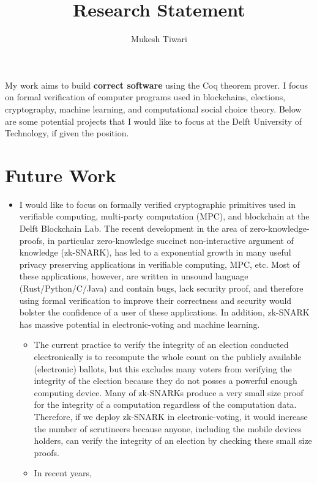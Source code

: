 \documentclass[a4paper]{article}
\title{Research Statement}
\author{Mukesh Tiwari}
\date{}
\begin{document}
\fontsize{11}{15}
\selectfont
\maketitle

My work aims to build \textbf{correct software} 
using the Coq theorem prover. 
I focus on formal verification of computer programs used in blockchains, elections, cryptography, 
machine learning, and computational social choice theory. Below are some potential projects 
that I would like to focus at the Delft University of Technology, if given the position.


\section{Future Work}
\begin{itemize}
\item I would like to focus 
	on formally verified cryptographic primitives used in
	verifiable computing, multi-party computation (MPC), and blockchain at the 
	Delft Blockchain Lab. The recent development in the 
	area of zero-knowledge-proofs, in particular 
	zero-knowledge succinct non-interactive argument of knowledge (zk-SNARK), 
	has led to a exponential growth in many useful 
	privacy preserving applications in verifiable computing, MPC, etc. Most of these 
	applications, however, are written 
	in unsound language (Rust/Python/C/Java) and contain bugs,
	lack security proof, and therefore using formal verification 
	to improve their correctness and security would bolster the 
	confidence of a user of these applications.
	In addition, zk-SNARK has massive potential in electronic-voting and machine learning. 
	\begin{itemize}
		\item The current practice to verify the integrity of an election conducted electronically is to 
		recompute the whole count on the publicly available (electronic) ballots, but 
		this excludes many voters from verifying the integrity of the election because 
		they do not posses a powerful enough computing device. Many of 
		zk-SNARKs produce a very small size proof for the integrity of a computation 
		regardless of the computation data. Therefore, if we deploy zk-SNARK in 
		electronic-voting, it would 
		increase the number of scrutineers because anyone, including the 
		mobile devices holders, can verify the integrity of an election 
		by checking these small size proofs. 
		\item In recent years, 

\end{itemize}
\end{itemize}
\end{document}
